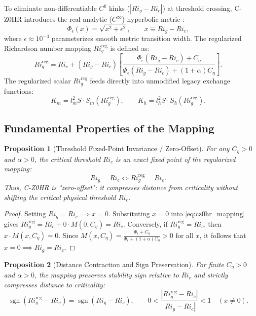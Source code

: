 \documentclass[11pt,a4paper]{article}
\newtheorem{proposition}{Proposition}
\begin{document}
To eliminate non-differentiable $C^0$ kinks ($|Ri_g - Ri_c|$) at threshold crossing, C-Z0HR introduces the real-analytic ($C^\infty$) hyperbolic metric \citep{tikhonov1963solution}:
\begin{equation}
\Phi_\epsilon(x) = \sqrt{x^2 + \epsilon^2}, \qquad x \equiv Ri_g - Ri_c,
\label{eq:hyperbolic_norm}
\end{equation}
where $\epsilon \approx 10^{-3}$ parameterizes smooth metric transition width. The regularized Richardson number mapping $Ri_g^{\text{reg}}$ is defined as:
\begin{equation}
Ri_g^{\text{reg}} = Ri_c + (Ri_g - Ri_c) \left[ \frac{\Phi_\epsilon(Ri_g - Ri_c) + C_\eta}{\Phi_\epsilon(Ri_g - Ri_c) + (1 + \alpha) C_\eta} \right].
\label{eq:cz0hr_mapping}
\end{equation}
The regularized scalar $Ri_g^{\text{reg}}$ feeds directly into unmodified legacy exchange functions:
\begin{equation}
K_m = l_m^2 S \cdot S_m\left(Ri_g^{\text{reg}}\right), \qquad K_h = l_h^2 S \cdot S_h\left(Ri_g^{\text{reg}}\right).
\end{equation}

\subsection{Fundamental Properties of the Mapping}

\begin{proposition}[Threshold Fixed-Point Invariance / Zero-Offset]
For any $C_\eta > 0$ and $\alpha > 0$, the critical threshold $Ri_c$ is an exact fixed point of the regularized mapping:
\begin{equation}
Ri_g = Ri_c \iff Ri_g^{\text{reg}} = Ri_c.
\end{equation}
Thus, C-Z0HR is "zero-offset": it compresses distance from criticality without shifting the critical physical threshold $Ri_c$.
\end{proposition}

\begin{proof}
Setting $Ri_g = Ri_c \implies x = 0$. Substituting $x = 0$ into \cref{eq:cz0hr_mapping} gives $Ri_g^{\text{reg}} = Ri_c + 0 \cdot M(0, C_\eta) = Ri_c$. Conversely, if $Ri_g^{\text{reg}} = Ri_c$, then $x \cdot M(x, C_\eta) = 0$. Since $M(x, C_\eta) = \frac{\Phi_\epsilon + C_\eta}{\Phi_\epsilon + (1+\alpha)C_\eta} > 0$ for all $x$, it follows that $x = 0 \implies Ri_g = Ri_c$.
\end{proof}

\begin{proposition}[Distance Contraction and Sign Preservation]
For finite $C_\eta > 0$ and $\alpha > 0$, the mapping preserves stability sign relative to $Ri_c$ and strictly compresses distance to criticality:
\begin{equation}
\operatorname{sgn}\left(Ri_g^{\text{reg}} - Ri_c\right) = \operatorname{sgn}\left(Ri_g - Ri_c\right), \qquad 0 < \frac{\left|Ri_g^{\text{reg}} - Ri_c\right|}{|Ri_g - Ri_c|} < 1 \quad (x \neq 0).
\end{equation}
\end{proposition}
\end{document}
